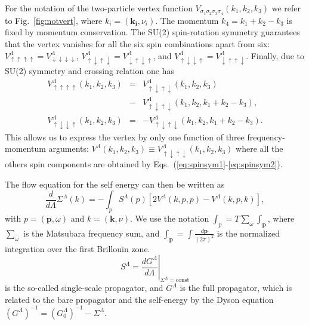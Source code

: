 For the notation of the two-particle vertex function $V_{\sigma_1\sigma_2\sigma_3\sigma_4}(k_1,k_2,k_3)$ we refer to Fig.~\ref{fig:notvert}, where $k_i=(\mathbf{k_i},\nu_i)$.
The momentum $k_4=k_1+k_2-k_3$ is fixed by momentum conservation.
The SU(2) spin-rotation symmetry guarantees that the vertex vanishes for all the six spin combinations apart from six:
$V^\Lambda_{\uparrow\uparrow\uparrow\uparrow} =
 V^\Lambda_{\downarrow\downarrow\downarrow\downarrow}$, 
$V^\Lambda_{\uparrow\downarrow\uparrow\downarrow} =
 V^\Lambda_{\downarrow\uparrow\downarrow\uparrow}$, and
$V^\Lambda_{\uparrow\downarrow\downarrow\uparrow } =
 V^\Lambda_{\downarrow\uparrow\uparrow\downarrow}$.   
Finally, due to SU(2) symmetry and crossing relation one has \cite{Rohringer2012} 
\begin{eqnarray}
\nonumber
V^\Lambda_{\uparrow\uparrow\uparrow\uparrow}(k_1,k_2,k_3) &=& V^\Lambda_{\uparrow\downarrow\uparrow\downarrow}(k_1,k_2,k_3)\\&-& V^\Lambda_{\uparrow\downarrow\uparrow\downarrow}(k_1,k_2,k_1+k_2-k_3),
\label{eq:spinsym1}
 \\ 
V^\Lambda_{\uparrow\downarrow\downarrow\uparrow}(k_1,k_2,k_3)& =& -V^\Lambda_{\uparrow\downarrow\uparrow\downarrow}(k_1,k_2,k_1+k_2-k_3).
\label{eq:spinsym2}
\end{eqnarray}
This allows us to express the vertex by only one function of three frequency-momentum arguments: $V^\Lambda(k_1,k_2,k_3)\equiv V^\Lambda_{\uparrow\downarrow\uparrow\downarrow}(k_1,k_2,k_3)$ where all the others spin components are obtained by Eqs.~(\ref{eq:spinsym1}-\ref{eq:spinsym2}).\cite{Husemann2009}

The flow equation for the self energy can then be written as \cite{Metzner2012} 
\begin{equation}
\frac{d}{d \Lambda} \Sigma^\Lambda(k)= -\int_p  S^\Lambda(p)\left[2V^\Lambda(k,p,p) -V^\Lambda(k,p,k)\right], 
\end{equation}
with $p=(\mathbf{p},\omega)$ and $k = (\mathbf{k},\nu)$.
We use the notation  $\int_{p} = T \sum_\omega \int_{\mathbf{p}}$, where $\sum_\omega$ is the Matsubara frequency sum, and $\int_{\mathbf{p}}=\int  \frac{d\mathbf{p}}{(2\pi)^2}$ is the normalized integration over the first Brillouin zone. 
\begin{equation}
 S^\Lambda = \left. \frac{dG^\Lambda}{d\Lambda}\right|_{\Sigma^{\Lambda}=\mathrm{const}} 
\end{equation}
is the so-called single-scale propagator, and ${G^\Lambda}$ is the full propagator, which is related to the bare propagator and the self-energy by the Dyson equation
$(G^\Lambda)^{-1} = (G_0^\Lambda)^{-1} - \Sigma^\Lambda$. 
  
